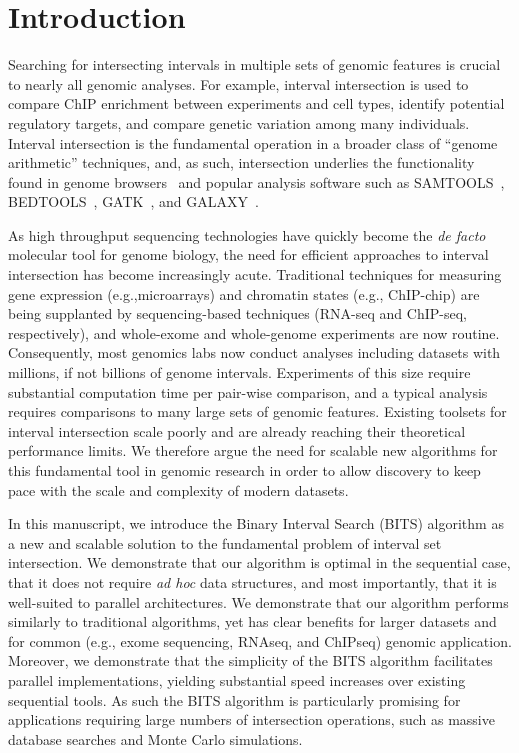 \documentclass{bioinfo}
\begin{document}
	\section{Introduction}

	Searching for intersecting intervals in multiple sets of genomic features is
	crucial to nearly all genomic analyses. For example, interval intersection is used
	to compare ChIP enrichment between experiments and cell types, identify potential
	regulatory targets, and compare genetic variation among many individuals.
	Interval intersection is the fundamental operation in a broader class of
	``genome arithmetic'' techniques, and, as such, intersection underlies the
	functionality found in genome browsers~\citep{kent2002,robinson2011} and popular
	analysis software such as SAMTOOLS~\citep{li2009}, BEDTOOLS~\citep{quinlan2010}, 
	GATK~\citep{mckenna2010}, and GALAXY~\citep{giardine2005}.

	As high throughput sequencing technologies have quickly become the \emph{de facto}
	molecular tool for genome biology, the need for efficient approaches 
	to interval intersection has become increasingly acute. Traditional techniques 
	for measuring gene expression (e.g.,microarrays) and chromatin states (e.g., ChIP-chip) 
	are being supplanted by sequencing-based techniques (RNA-seq and ChIP-seq, respectively), and
	whole-exome and whole-genome experiments are now routine. Consequently, most
	genomics labs now conduct analyses including datasets with millions, if not billions 
	of genome intervals. Experiments of this size require substantial computation time per 
	pair-wise comparison, and a typical analysis requires comparisons to many large
	sets of genomic features. Existing toolsets for interval intersection scale poorly 
	and are already reaching their theoretical performance limits. We therefore argue the
	need for scalable new algorithms for this fundamental tool in genomic research
	in order to allow discovery to keep pace with the scale and complexity of modern datasets.

	In this manuscript, we introduce the Binary Interval Search (BITS) algorithm 
	as a new and scalable solution to the fundamental problem of interval set 
	intersection.  We demonstrate that our algorithm is optimal in the sequential case, 
	that it does not require \emph{ad hoc} data structures, and most importantly, that it 
	is well-suited to parallel architectures. We demonstrate that our algorithm performs
	similarly to traditional algorithms, yet has clear benefits for larger datasets and 
	for common (e.g., exome sequencing, RNAseq, and ChIPseq) genomic application. Moreover,
	we demonstrate that the simplicity of the BITS algorithm facilitates parallel
	implementations, yielding substantial speed increases over existing sequential tools.
	As such the BITS algorithm is particularly promising for applications requiring 
	large numbers of intersection operations, such as massive database searches and 
	Monte Carlo simulations.
\end{document}

